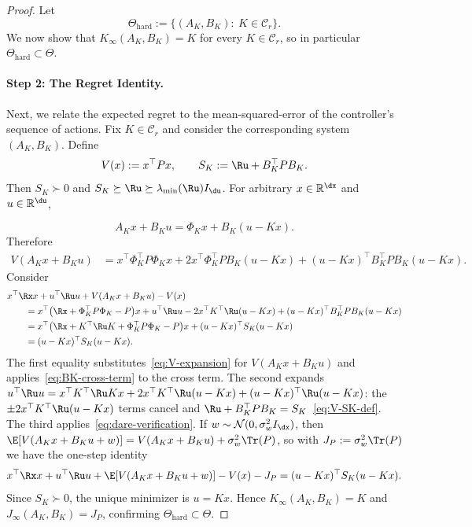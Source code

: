 \documentclass[11pt,journal,onecolumn]{IEEEtran}
\newcommand{\R}{\mathbb{R}}
\begin{document}
\begin{proof}
Let
\begin{equation}\label{eq:Theta-hard-def}
    \Theta_{\mathrm{hard}} := \{(A_K,B_K):\ K\in\mathcal{C}_r\}.
\end{equation}
We now show that $K_\infty(A_K,B_K)=K$ for every $K\in\mathcal{C}_r$, so in particular $\Theta_{\mathrm{hard}}\subset \Theta$.

\medskip
\paragraph{Step 2: The Regret Identity.} Next, we relate the expected regret to the mean-squared-error of the controller's sequence of actions. Fix $K\in\mathcal{C}_r$ and consider the corresponding system $(A_K,B_K)$. Define
\begin{equation}\label{eq:V-SK-def}
    V(x):=x^\top P x,
    \qquad
    S_K:=\Ru+B_K^\top P B_K.
\end{equation}
Then $S_K\succ 0$ and $S_K \succeq \Ru \succeq \lambda_{\min}(\Ru) I_{\du}$.
For arbitrary $x\in\R^{\dx}$ and $u\in\R^{\du}$,

\begin{equation}\label{eq:closed-loop-split}
    A_Kx+B_Ku = \Phi_Kx + B_K(u-Kx).
\end{equation}
Therefore
\begin{align}\label{eq:V-expansion}
    V(A_Kx+B_Ku)
    &=
    x^\top \Phi_K^\top P\Phi_K x
    + 2x^\top \Phi_K^\top P B_K (u-Kx)
    + (u-Kx)^\top B_K^\top P B_K (u-Kx).
\end{align}
Consider
\begin{align}\label{eq:complete-square}
    &x^\top \Rx x + u^\top \Ru u + V(A_Kx+B_Ku)-V(x) \nonumber\\
    &\qquad=
    x^\top\bigl(\Rx + \Phi_K^\top P\Phi_K - P\bigr)x
    + u^\top \Ru u
    - 2x^\top K^\top \Ru (u-Kx)
    + (u-Kx)^\top B_K^\top P B_K(u-Kx) \nonumber\\
    &\qquad=
    x^\top\bigl(\Rx+K^\top \Ru K+\Phi_K^\top P\Phi_K-P\bigr)x
    +(u-Kx)^\top S_K(u-Kx) \nonumber\\
    &\qquad=
    (u-Kx)^\top S_K(u-Kx).
\end{align}
The first equality substitutes~\eqref{eq:V-expansion} for $V(A_Kx+B_Ku)$ and applies~\eqref{eq:BK-cross-term} to the cross term. The second expands $u^\top \Ru u = x^\top K^\top \Ru Kx + 2x^\top K^\top \Ru(u-Kx) + (u-Kx)^\top \Ru(u-Kx)$: the $\pm 2x^\top K^\top \Ru(u-Kx)$ terms cancel and $\Ru + B_K^\top P B_K = S_K$~\eqref{eq:V-SK-def}. The third applies~\eqref{eq:dare-verification}.
If $w\sim\mathcal N(0,\sigma_w^2 I_{\dx})$, then
$\E[V(A_Kx+B_Ku+w)] = V(A_Kx+B_Ku) + \sigma_w^2\Tr(P)$,
so with $J_P := \sigma_w^2\Tr(P)$ we have the one-step identity
\begin{equation}
\label{eq:bellman-converse}
    x^\top \Rx x + u^\top \Ru u
    + \E\!\left[V(A_Kx+B_Ku+w)\right]
    - V(x) - J_P
    =
    (u-Kx)^\top S_K(u-Kx).
\end{equation}
Since $S_K\succ 0$, the unique minimizer is $u=Kx$. Hence
$K_\infty(A_K,B_K)=K$ and $J_\infty(A_K,B_K)=J_P$,
confirming $\Theta_{\mathrm{hard}}\subset \Theta$.


\end{proof}
\end{document}
